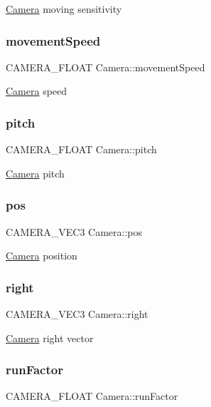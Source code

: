 \hyperlink{class_camera}{Camera} moving sensitivity \mbox{\label{class_camera_a2e09cc969e7e7733051df9a0bfe9afa0}} 
\subsubsection{\texorpdfstring{movement\+Speed}{movementSpeed}}
{\footnotesize\ttfamily C\+A\+M\+E\+R\+A\+\_\+\+F\+L\+O\+AT Camera\+::movement\+Speed}

\hyperlink{class_camera}{Camera} speed \mbox{\label{class_camera_aaaff48d7638a7e3cc7e141f11cc23293}} 
\subsubsection{\texorpdfstring{pitch}{pitch}}
{\footnotesize\ttfamily C\+A\+M\+E\+R\+A\+\_\+\+F\+L\+O\+AT Camera\+::pitch}

\hyperlink{class_camera}{Camera} pitch \mbox{\label{class_camera_a645cd9343d8c0160ce2281111240f9fd}} 
\subsubsection{\texorpdfstring{pos}{pos}}
{\footnotesize\ttfamily C\+A\+M\+E\+R\+A\+\_\+\+V\+E\+C3 Camera\+::pos}

\hyperlink{class_camera}{Camera} position \mbox{\label{class_camera_aa242be0f8ab49b72ec65fcdcec807bb5}} 
\subsubsection{\texorpdfstring{right}{right}}
{\footnotesize\ttfamily C\+A\+M\+E\+R\+A\+\_\+\+V\+E\+C3 Camera\+::right}

\hyperlink{class_camera}{Camera} right vector \mbox{\label{class_camera_a891d353a14161c6be625f6a52b75375d}} 
\subsubsection{\texorpdfstring{run\+Factor}{runFactor}}
{\footnotesize\ttfamily C\+A\+M\+E\+R\+A\+\_\+\+F\+L\+O\+AT Camera\+::run\+Factor}

